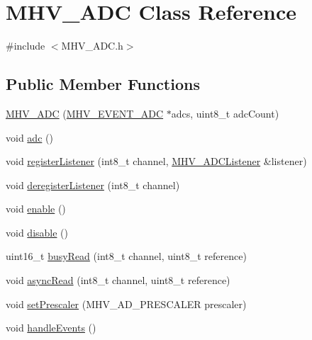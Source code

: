 \hypertarget{class_m_h_v___a_d_c}{\section{M\-H\-V\-\_\-\-A\-D\-C Class Reference}
\label{class_m_h_v___a_d_c}
}


{\ttfamily \#include $<$M\-H\-V\-\_\-\-A\-D\-C.\-h$>$}

\subsection*{Public Member Functions}
\begin{DoxyCompactItemize}
\item 
\hyperlink{class_m_h_v___a_d_c_a99020253bc4e308715108a37ff317471}{M\-H\-V\-\_\-\-A\-D\-C} (\hyperlink{_m_h_v___a_d_c_8h_a21c373c52cc2836a0010981c9b63d1f9}{M\-H\-V\-\_\-\-E\-V\-E\-N\-T\-\_\-\-A\-D\-C} $\ast$adcs, uint8\-\_\-t adc\-Count)
\item 
void \hyperlink{class_m_h_v___a_d_c_a62548b3bbb7b2e916a5adba15d40723f}{adc} ()
\item 
void \hyperlink{class_m_h_v___a_d_c_a5f851f487355a1a749b1e716d32d2c14}{register\-Listener} (int8\-\_\-t channel, \hyperlink{class_m_h_v___a_d_c_listener}{M\-H\-V\-\_\-\-A\-D\-C\-Listener} \&listener)
\item 
void \hyperlink{class_m_h_v___a_d_c_a2d954cfe88bf7f67b7344b5356202cb7}{deregister\-Listener} (int8\-\_\-t channel)
\item 
void \hyperlink{class_m_h_v___a_d_c_a5578b8f74a62fbf4207dd10a6d3da4f0}{enable} ()
\item 
void \hyperlink{class_m_h_v___a_d_c_ad7eb5acfd0484c0213dcfb6851de2052}{disable} ()
\item 
uint16\-\_\-t \hyperlink{class_m_h_v___a_d_c_ae466a6a016739a21cf872e230704a56e}{busy\-Read} (int8\-\_\-t channel, uint8\-\_\-t reference)
\item 
void \hyperlink{class_m_h_v___a_d_c_a07e1c2813885be53550ff519470f8d22}{async\-Read} (int8\-\_\-t channel, uint8\-\_\-t reference)
\item 
void \hyperlink{class_m_h_v___a_d_c_a29943f22942857e41e6c060ec7238765}{set\-Prescaler} (M\-H\-V\-\_\-\-A\-D\-\_\-\-P\-R\-E\-S\-C\-A\-L\-E\-R prescaler)
\item 
void \hyperlink{class_m_h_v___a_d_c_a431d2be95d566a7595691a0ecb40ba54}{handle\-Events} ()
\end{DoxyCompactItemize}
